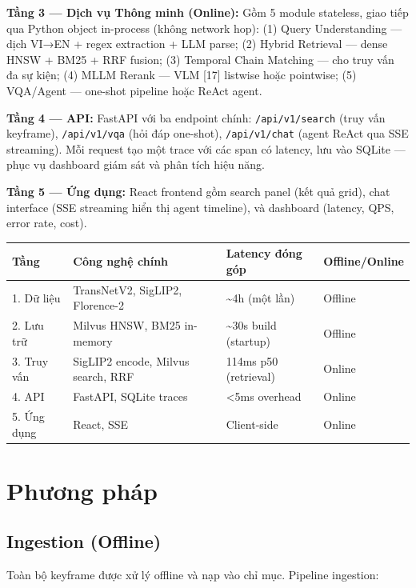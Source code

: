 \documentclass[12pt,a4paper,onecolumn]{article}
\begin{document}
\textbf{Tầng 3 — Dịch vụ Thông minh (Online):} Gồm 5 module stateless, giao tiếp qua Python object in-process (không network hop): (1) Query Understanding — dịch VI→EN + regex extraction + LLM parse; (2) Hybrid Retrieval — dense HNSW + BM25 + RRF fusion; (3) Temporal Chain Matching — cho truy vấn đa sự kiện; (4) MLLM Rerank — VLM [17] listwise hoặc pointwise; (5) VQA/Agent — one-shot pipeline hoặc ReAct agent.

\textbf{Tầng 4 — API:} FastAPI với ba endpoint chính: \texttt{/api/v1/search} (truy vấn keyframe), \texttt{/api/v1/vqa} (hỏi đáp one-shot), \texttt{/api/v1/chat} (agent ReAct qua SSE streaming). Mỗi request tạo một trace với các span có latency, lưu vào SQLite — phục vụ dashboard giám sát và phân tích hiệu năng.

\textbf{Tầng 5 — Ứng dụng:} React frontend gồm search panel (kết quả grid), chat interface (SSE streaming hiển thị agent timeline), và dashboard (latency, QPS, error rate, cost).

\begin{center}
\begin{tabular}{l l l l}
\toprule
Tầng & Công nghệ chính & Latency đóng góp & Offline/Online \\
\midrule
1. Dữ liệu & TransNetV2, SigLIP2, Florence-2 & \textasciitilde{}4h (một lần) & Offline \\
2. Lưu trữ & Milvus HNSW, BM25 in-memory & \textasciitilde{}30s build (startup) & Offline \\
3. Truy vấn & SigLIP2 encode, Milvus search, RRF & 114ms p50 (retrieval) & Online \\
4. API & FastAPI, SQLite traces & <5ms overhead & Online \\
5. Ứng dụng & React, SSE & Client-side & Online \\
\bottomrule
\end{tabular}
\end{center}


\section{Phương pháp}

\subsection{Ingestion (Offline)}

Toàn bộ keyframe được xử lý offline và nạp vào chỉ mục. Pipeline ingestion:
\end{document}
